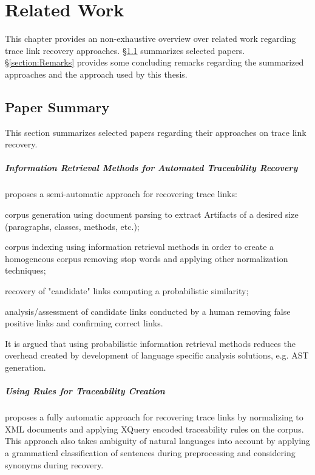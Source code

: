 \chapter{Related Work}
\label{chapter:RelatedWork}
This chapter provides an non-exhaustive overview over related work regarding trace link recovery approaches.
§\ref{section:PaperSummary} summarizes selected papers.
§\ref{section:Remarks} provides some concluding remarks regarding the summarized approaches and the approach used by this thesis.

\section{Paper Summary}
\label{section:PaperSummary}
This section summarizes selected papers regarding their approaches on trace link recovery.

\paragraph*{Information Retrieval Methods for Automated Traceability Recovery}
\cite{DeLucia2012} 
proposes a semi-automatic approach for recovering trace links:
\begin{enumerate*}[label={(\roman*)}]
\item
corpus generation using document parsing to extract \glspl{Artifact} of a desired size (paragraphs, classes, methods, etc.);
\item
corpus indexing using information retrieval methods in order to create a homogeneous corpus removing stop words and applying other normalization techniques;
\item
recovery of "candidate" links computing a probabilistic similarity;
\item
analysis/assessment of candidate links conducted by a human removing false positive links and confirming correct links.
\end{enumerate*}
It is argued that using probabilistic information retrieval methods reduces the  overhead created by development of language specific analysis solutions, e.g. \gls{AST} generation.

\paragraph*{Using Rules for Traceability Creation} 
\cite{Zisman2012}
proposes a fully automatic approach for recovering trace links by normalizing to \gls{XML} documents and applying XQuery encoded traceability rules on the corpus.
This approach also takes ambiguity of natural languages into account by applying a grammatical classification of sentences during preprocessing and considering synonyms during recovery.

